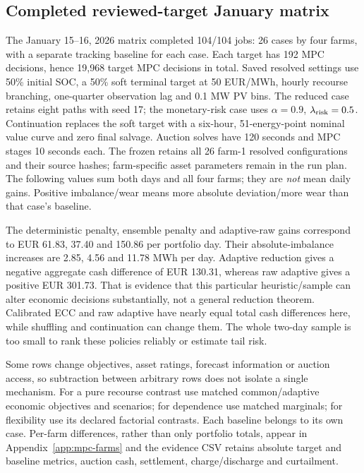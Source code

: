 \subsection{Completed reviewed-target January matrix}
The January 15--16, 2026 matrix completed 104/104 jobs: 26 cases by four farms,
with a separate tracking baseline for each case. Each target has 192 MPC
decisions, hence 19,968 target MPC decisions in total. Saved resolved settings
use 50\% initial SOC, a 50\% soft terminal target at 50 EUR/MWh, hourly
recourse branching, one-quarter observation lag and 0.1 MW PV bins. The
reduced case retains eight paths with seed 17; the monetary-risk case uses
$\alpha=0.9$, $\lambda_{\rm risk}=0.5$. Continuation replaces the soft target
with a six-hour, 51-energy-point nominal value curve and zero final salvage.
Auction solves have 120 seconds and MPC stages 10 seconds each. The frozen
 retains all 26 farm-1 resolved configurations
and their source hashes; farm-specific asset parameters remain in the run plan.
The following values
sum both days and all four farms; they are \emph{not} mean daily gains. Positive
imbalance/wear means more absolute deviation/more wear than that case's baseline.

The deterministic penalty, ensemble penalty and adaptive-raw gains correspond
to EUR 61.83, 37.40 and 150.86 per portfolio day. Their absolute-imbalance
increases are 2.85, 4.56 and 11.78 MWh per day. Adaptive reduction gives a
negative aggregate cash difference of EUR 130.31, whereas raw adaptive gives
a positive EUR 301.73. That is evidence that this particular heuristic/sample
can alter economic decisions substantially, not a general reduction theorem.
Calibrated ECC and raw adaptive have nearly equal total cash differences here,
while shuffling and continuation can change them. The whole two-day sample
is too small to rank these policies reliably or estimate tail risk.

Some rows change objectives, asset ratings, forecast information or auction
access, so subtraction between arbitrary rows does not isolate a single
mechanism. For a pure recourse contrast use matched common/adaptive economic
objectives and scenarios; for dependence use matched marginals; for flexibility
use its declared factorial contrasts. Each baseline belongs to its own case.
Per-farm differences, rather than only portfolio totals, appear in
Appendix~\ref{app:mpc-farms} and the evidence CSV retains absolute target and
baseline metrics, auction cash, settlement, charge/discharge and curtailment.

